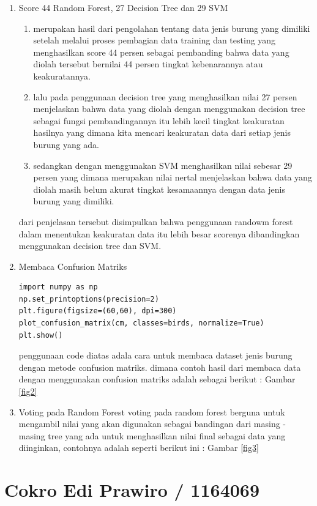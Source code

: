 \begin{enumerate}
\item Score 44 Random Forest, 27 Decision Tree dan 29 SVM
\begin{enumerate}
\item
merupakan hasil dari pengolahan tentang data jenis burung yang dimiliki setelah melalui proses pembagian data training dan testing yang menghasilkan score 44 persen sebagai pembanding bahwa data yang diolah tersebut bernilai 44 persen tingkat kebenarannya atau keakuratannya.
\item
lalu pada penggunaan decision tree yang menghasilkan nilai 27 persen menjelaskan bahwa data yang diolah dengan menggunakan decision tree sebagai fungsi pembandingannya itu lebih kecil tingkat keakuratan hasilnya yang dimana kita mencari keakuratan data dari setiap jenis burung yang ada.
\item
sedangkan dengan menggunakan SVM menghasilkan nilai sebesar 29 persen yang dimana merupakan nilai nertal menjelaskan bahwa data yang diolah masih belum akurat tingkat kesamaannya dengan data jenis burung yang dimiliki.
\end{enumerate}
dari penjelasan tersebut disimpulkan bahwa penggunaan randowm forest dalam menentukan keakuratan data itu lebih besar scorenya dibandingkan menggunakan decision tree dan SVM.

\item Membaca Confusion Matriks
\begin{verbatim}
import numpy as np
np.set_printoptions(precision=2)
plt.figure(figsize=(60,60), dpi=300)
plot_confusion_matrix(cm, classes=birds, normalize=True)
plt.show()
\end{verbatim}
penggunaan code diatas adala cara untuk membaca dataset jenis burung dengan metode confusion matriks. dimana contoh hasil dari membaca data dengan menggunakan confusion matriks adalah sebagai berikut : Gambar \ref{fig2}

\item Voting pada Random Forest
voting pada random forest berguna untuk mengambil nilai yang akan digunakan sebagai bandingan dari masing - masing tree yang ada untuk menghasilkan nilai final sebagai data yang diinginkan, contohnya adalah seperti berikut ini : Gambar \ref{fig3}
\end{enumerate}








\section{Cokro Edi Prawiro / 1164069}

